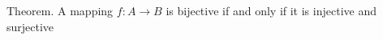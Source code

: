 \documentclass[preview]{standalone}
\begin{document}
\begin{center}
Theorem. A mapping $f : A \to B$ is bijective if and only if it is injective and surjective
\end{center}
\end{document}

